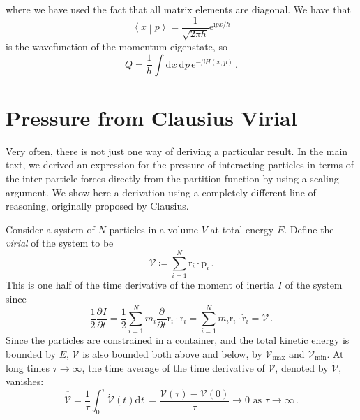 \documentclass{article}
\theoremstyle{plain}\theoremheaderfont{\normalfont\bfseries}\theorembodyfont{\rmfamily}\theoremseparator{.}\newtheorem*{thm}{Theorem}\newtheorem*{law}{Law}\newtheorem*{pos}{Postulate}
\numberwithin{equation}{section}
\newcommand{\ii}{\mathrm{i}}
\newcommand{\ee}{\mathrm{e}}
\newcommand{\dd}[2][]{\mathrm{d}^{#1} #2\,}
\newcommand{\pdv}[3][]{\frac{\partial^{#1} #2}{{\partial #3}^{#1}}}
\newcommand{\braket}[2]{\left\langle #1 \middle| #2 \right\rangle}
\newcommand{\vb}[1]{\bm{\mathrm{#1}}}
\newcommand{\vdot}{\,\bm{\mathrm{\cdot}}\,}
\begin{document}
    where we have used the fact that all matrix elements are diagonal. We have that
    \begin{equation}
        \braket{x}{p}=\frac{1}{\sqrt{2\pi\hbar}}\ee^{\ii px/\hbar}
    \end{equation}
    is the wavefunction of the momentum eigenstate, so
    \begin{equation}
        Q=\frac{1}{h}\int\dd{x}\dd{p}\ee^{-\beta H(x,p)}\,.
    \end{equation}

    \section{Pressure from Clausius Virial}
    Very often, there is not just one way of deriving a particular result. In the main text, we derived an expression for the pressure of interacting particles in terms of the inter-particle forces directly from the partition function by using a scaling argument. We show here a derivation using a completely different line of reasoning, originally proposed by Clausius.

    Consider a system of \(N\) particles in a volume \(V\) at total energy \(E\). Define the \textit{virial} of the system to be
    \begin{equation}
        \mathcal{V}\coloneqq\sum_{i=1}^{N}\vb{r}_i\vdot\vb{p}_i\,.
    \end{equation}
    This is one half of the time derivative of the moment of inertia \(I\) of the system since
    \begin{equation}
        \frac{1}{2}\pdv{I}{t}=\frac{1}{2}\sum_{i=1}^{N}m_i\pdv{}{t}\vb{r}_i\vdot\vb{r}_i=\sum_{i=1}^{N}m_i\vb{r}_i\vdot\dot{\vb{r}}_i=\mathcal{V}\,.
    \end{equation}
    Since the particles are constrained in a container, and the total kinetic energy is bounded by \(E\), \(\mathcal{V}\) is also bounded both above and below, by \(\mathcal{V}_{\text{max}}\) and \(\mathcal{V}_{\text{min}}\). At long times \(\tau\to\infty\), the time average of the time derivative of \(\mathcal{V}\), denoted by \(\dot{\mathcal{V}}\), vanishes:
    \begin{equation}
        \overline{\dot{\mathcal{V}}}=\frac{1}{\tau}\int_{0}^{\tau}\dot{\mathcal{V}}(t)\dd{t}=\frac{\mathcal{V}(\tau)-\mathcal{V}(0)}{\tau}\to 0\text{ as }\tau\to\infty\,.
    \end{equation}
\end{document}
